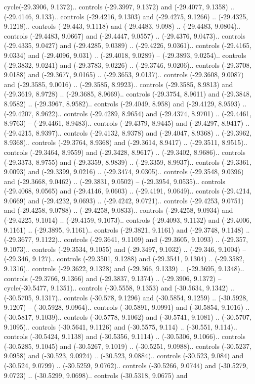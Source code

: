 \begin{scope}[shift={(2.5552, 9.9912)}]
\begin{scope}[shift={(48.1654, -14.8546)}]
cycle(-29.3906, 9.1372).. controls (-29.3997, 9.1372) and (-29.4077, 9.1358) .. (-29.4146, 9.133).. controls (-29.4216, 9.1303) and (-29.4275, 9.1266) .. (-29.4325, 9.1218).. controls (-29.443, 9.1118) and (-29.4483, 9.098) .. (-29.4483, 9.0804).. controls (-29.4483, 9.0667) and (-29.4447, 9.0557) .. (-29.4376, 9.0473).. controls (-29.4335, 9.0427) and (-29.4285, 9.0389) .. (-29.4226, 9.0361).. controls (-29.4165, 9.0334) and (-29.4096, 9.031) .. (-29.4018, 9.0289) -- (-29.3893, 9.0254).. controls (-29.3832, 9.0241) and (-29.3783, 9.0226) .. (-29.3746, 9.0206).. controls (-29.3708, 9.0188) and (-29.3677, 9.0165) .. (-29.3653, 9.0137).. controls (-29.3608, 9.0087) and (-29.3585, 9.0016) .. (-29.3585, 8.9923).. controls (-29.3585, 8.9813) and (-29.3619, 8.9728) .. (-29.3685, 8.9669).. controls (-29.3754, 8.9611) and (-29.3848, 8.9582) .. (-29.3967, 8.9582).. controls (-29.4049, 8.958) and (-29.4129, 8.9593) .. (-29.4207, 8.9622).. controls (-29.4289, 8.9654) and (-29.4374, 8.9701) .. (-29.4461, 8.9763) -- (-29.4461, 8.9483).. controls (-29.4379, 8.9445) and (-29.4297, 8.9417) .. (-29.4215, 8.9397).. controls (-29.4132, 8.9378) and (-29.4047, 8.9368) .. (-29.3962, 8.9368).. controls (-29.3764, 8.9368) and (-29.3614, 8.9417) .. (-29.3511, 8.9515).. controls (-29.3464, 8.9559) and (-29.3428, 8.9617) .. (-29.3402, 8.9686).. controls (-29.3373, 8.9755) and (-29.3359, 8.9839) .. (-29.3359, 8.9937).. controls (-29.3361, 9.0093) and (-29.3399, 9.0216) .. (-29.3474, 9.0305).. controls (-29.3548, 9.0396) and (-29.3668, 9.0462) .. (-29.3831, 9.0502) -- (-29.3954, 9.0535).. controls (-29.4068, 9.0565) and (-29.4146, 9.0603) .. (-29.4191, 9.0649).. controls (-29.4214, 9.0669) and (-29.4232, 9.0693) .. (-29.4242, 9.0721).. controls (-29.4253, 9.0751) and (-29.4258, 9.0788) .. (-29.4258, 9.0833).. controls (-29.4258, 9.0934) and (-29.4225, 9.1014) .. (-29.4159, 9.1073).. controls (-29.4093, 9.1132) and (-29.4006, 9.1161) .. (-29.3895, 9.1161).. controls (-29.3821, 9.1161) and (-29.3748, 9.1148) .. (-29.3677, 9.1122).. controls (-29.3641, 9.1109) and (-29.3605, 9.1093) .. (-29.357, 9.1073).. controls (-29.3534, 9.1055) and (-29.3497, 9.1032) .. (-29.346, 9.1004) -- (-29.346, 9.127).. controls (-29.3501, 9.1288) and (-29.3541, 9.1304) .. (-29.3582, 9.1316).. controls (-29.3622, 9.1328) and (-29.366, 9.1339) .. (-29.3695, 9.1348).. controls (-29.3766, 9.1366) and (-29.3837, 9.1374) .. (-29.3906, 9.1372) -- cycle(-30.5477, 9.1351).. controls (-30.5558, 9.1353) and (-30.5634, 9.1342) .. (-30.5705, 9.1317).. controls (-30.578, 9.1296) and (-30.5854, 9.1259) .. (-30.5928, 9.1207) -- (-30.5928, 9.0964).. controls (-30.5891, 9.0991) and (-30.5854, 9.1016) .. (-30.5817, 9.1039).. controls (-30.5778, 9.1062) and (-30.5741, 9.1081) .. (-30.5707, 9.1095).. controls (-30.5641, 9.1126) and (-30.5575, 9.114) .. (-30.551, 9.114).. controls (-30.5424, 9.1138) and (-30.5356, 9.1114) .. (-30.5306, 9.1066).. controls (-30.5285, 9.1045) and (-30.5267, 9.1019) .. (-30.5251, 9.0988).. controls (-30.5237, 9.0958) and (-30.523, 9.0924) .. (-30.523, 9.0884).. controls (-30.523, 9.084) and (-30.524, 9.0799) .. (-30.5259, 9.0762).. controls (-30.5266, 9.0744) and (-30.5279, 9.0723) .. (-30.5299, 9.0698).. controls (-30.5318, 9.0675) and 
\end{scope}
\end{scope}
